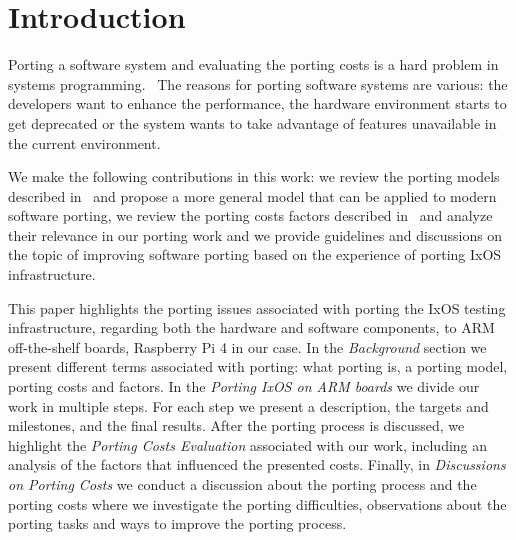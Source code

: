 \section{Introduction}

Porting a software system and evaluating the porting costs is a hard problem in
systems programming.~\cite{b1,b2,b4,b5,b9,b10,b11,b12,b13,b14,b15,b16} The
reasons for porting software systems are various: the developers want to enhance
the performance, the hardware environment starts to get deprecated or the system
wants to take advantage of features unavailable in the current environment.

We make the following contributions in this work: we review the porting models
described in~\cite{b1,b2,b9} and propose a more general model that can be
applied to modern software porting, we review the porting costs factors
described in~\cite{b2} and analyze their relevance in our porting work and we
provide guidelines and discussions on the topic of improving software porting
based on the experience of porting IxOS infrastructure.

This paper highlights the porting issues associated with porting the IxOS
testing infrastructure, regarding both the hardware and software components, to
ARM off-the-shelf boards, Raspberry Pi 4 in our case. In the \textit{Background}
section we present different terms associated with porting: what porting is, a
porting model, porting costs and factors. In the \textit{Porting IxOS on ARM
boards} we divide our work in multiple steps. For each step we present a
description, the targets and milestones, and the final results.  After the
porting process is discussed, we highlight the \textit{Porting Costs Evaluation}
associated with our work, including an analysis of the factors that influenced
the presented costs.  Finally, in \textit{Discussions on Porting Costs} we
conduct a discussion about the porting process and the porting costs where we
investigate the porting difficulties, observations about the porting tasks and
ways to improve the porting process. 
